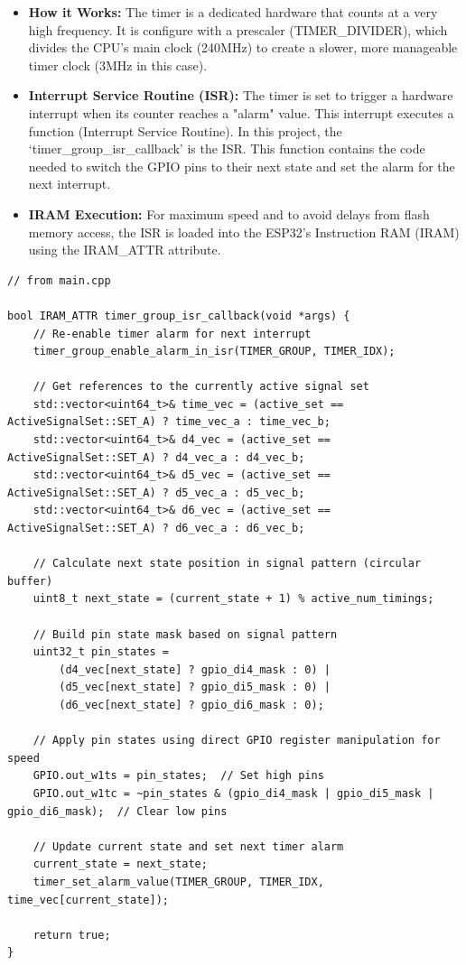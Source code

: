 \begin{itemize}
    \item \textbf{How it Works:} The timer is a dedicated hardware that counts at a very high frequency.
        It is configure with a prescaler (TIMER\_DIVIDER), which divides the CPU's main clock (240MHz) to create
        a slower, more manageable timer clock (3MHz in this case).
    \item \textbf{Interrupt Service Routine (ISR):} The timer is set to trigger a hardware interrupt when its counter reaches
        a "alarm" value. This interrupt executes a function (Interrupt Service Routine). In this project, the `timer\_group\_isr\_callback'
        is the ISR. This function contains the code needed to switch the GPIO pins to their next state and set the alarm for the next
        interrupt.
    \item \textbf{IRAM Execution:} For maximum speed and to avoid delays from flash memory access, the ISR is loaded into the ESP32's
        Instruction RAM (IRAM) using the IRAM\_ATTR attribute.
\end{itemize}


\begin{lstlisting}[caption={Core ISR logic}]
// from main.cpp

bool IRAM_ATTR timer_group_isr_callback(void *args) {
    // Re-enable timer alarm for next interrupt
    timer_group_enable_alarm_in_isr(TIMER_GROUP, TIMER_IDX);

    // Get references to the currently active signal set
    std::vector<uint64_t>& time_vec = (active_set == ActiveSignalSet::SET_A) ? time_vec_a : time_vec_b;
    std::vector<uint64_t>& d4_vec = (active_set == ActiveSignalSet::SET_A) ? d4_vec_a : d4_vec_b;
    std::vector<uint64_t>& d5_vec = (active_set == ActiveSignalSet::SET_A) ? d5_vec_a : d5_vec_b;
    std::vector<uint64_t>& d6_vec = (active_set == ActiveSignalSet::SET_A) ? d6_vec_a : d6_vec_b;

    // Calculate next state position in signal pattern (circular buffer)
    uint8_t next_state = (current_state + 1) % active_num_timings;
    
    // Build pin state mask based on signal pattern
    uint32_t pin_states =
        (d4_vec[next_state] ? gpio_di4_mask : 0) |
        (d5_vec[next_state] ? gpio_di5_mask : 0) |
        (d6_vec[next_state] ? gpio_di6_mask : 0);

    // Apply pin states using direct GPIO register manipulation for speed
    GPIO.out_w1ts = pin_states;  // Set high pins
    GPIO.out_w1tc = ~pin_states & (gpio_di4_mask | gpio_di5_mask | gpio_di6_mask);  // Clear low pins

    // Update current state and set next timer alarm
    current_state = next_state;
    timer_set_alarm_value(TIMER_GROUP, TIMER_IDX, time_vec[current_state]);

    return true;
}
\end{lstlisting}

